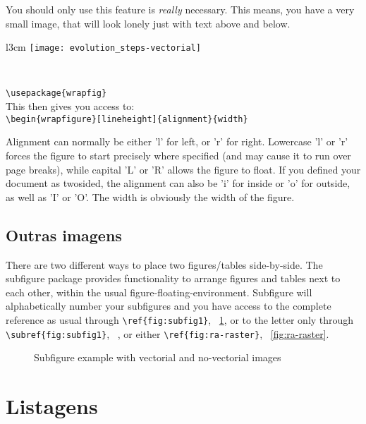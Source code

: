  You should only use this feature is \emph{really} necessary. This means, you have a very small image, that will look lonely just with text above and below.

 \begin{wrapfigure}{l}{3cm}
   \centering
     \texttt{[image: evolution\_steps-vectorial]}
   \caption{Vectorial image}\
 \end{wrapfigure}	
 
 \noindent\verb!\usepackage{wrapfig}!\\
 This then gives you access to:\\
 \verb!\begin{wrapfigure}[lineheight]{alignment}{width}!
 
 Alignment can normally be either 'l' for left, or 'r' for right. Lowercase 'l' or 'r' forces the figure to start precisely where specified (and may cause it to run over page breaks), while capital 'L' or 'R' allows the figure to float. If you defined your document as twosided, the alignment can also be 'i' for inside or 'o' for outside, as well as 'I' or 'O'. The width is obviously the width of the figure. 
 
 
\subsection{Outras imagens} %
\label{ssec:floats_figures_and_captions}

 
There are two different ways to place two figures/tables side-by-side. The subfigure package provides functionality to arrange figures and tables next to each other, within the usual figure-floating-environment. Subfigure will alphabetically number your subfigures and you have access to the complete reference as usual through \verb!\ref{fig:subfig1}!, \figurename~\ref{fig:figura-completa}, or to the letter only through \verb!\subref{fig:subfig1}!, ~, or either \verb!\ref{fig:ra-raster}!,  \figurename~\ref{fig:ra-raster}.

\begin{figure}[H]
	\centering
\qquad\qquad
  \caption{Subfigure example with vectorial and no-vectorial images}
  \label{fig:figura-completa}
\end{figure}

\section{Listagens} %
\label{sec:listings}

